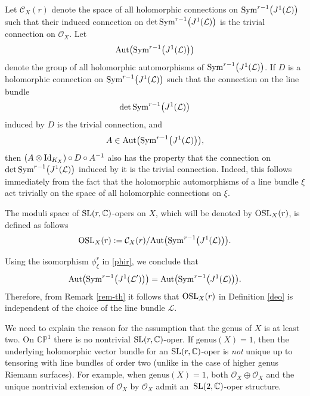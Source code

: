 \documentclass[10pt,a4paper]{amsart}
\numberwithin{equation}{section}
\begin{document}
Let ${\mathcal C}_X(r)$ denote the space of all holomorphic connections on ${\rm Sym}^{r-1}\bigl(J^1(\mathcal L)\bigr)$ such that their induced connection on $\det {\rm Sym}^{r-1}\bigl(J^1(\mathcal
L)\bigr)$ is the trivial connection on ${\mathcal O}_X$. Let
\[
\text{Aut}\bigl({\rm
Sym}^{r-1}\bigl(J^1(\mathcal L)\bigr)\bigr)\]
 denote the group of all holomorphic automorphisms of ${\rm
Sym}^{r-1}\bigl(J^1(\mathcal L)\bigr)$. If $D$ is a holomorphic connection on ${\rm
Sym}^{r-1}\bigl(J^1(\mathcal L)\bigr)$ such that the connection on the line bundle
\[
\det {\rm
Sym}^{r-1}\bigl(J^1(\mathcal L)\bigr)\]
 induced by $D$ is the trivial connection, and
\[
A \in \text{Aut}\bigl({\rm Sym}^{r-1}\bigl(J^1(\mathcal L)\bigr)\bigr),
\]
then %
$(A\otimes{\rm
Id}_{K_X})\circ D\circ A^{-1}$ also has the property that the connection on $\det {\rm
Sym}^{r-1}\bigl(J^1(\mathcal L)\bigr)$ induced by it is the trivial connection. Indeed, this follows immediately from
the fact that the holomorphic automorphisms of a line bundle $\xi$ act trivially on the space of all
holomorphic connections on $\xi$.

\begin{Definition}\label{deo}
The moduli space of ${\rm SL}(r, {\mathbb C})$-opers on $X$, which will be denoted by ${\rm OSL}_X(r)$, is defined as follows
\begin{equation}\label{f2}
{\rm OSL}_X(r) := {\mathcal C}_X(r)/\text{Aut}\bigl({\rm
Sym}^{r-1}\bigl(J^1(\mathcal L)\bigr)\bigr).
\end{equation}\end{Definition}

{}Using the isomorphism $\phi^r_\xi$ in \eqref{phir}, we conclude that
\[
\text{Aut}\bigl({\rm Sym}^{r-1}\bigl(J^1({\mathcal L}')\bigr)\bigr)
 = \text{Aut}\bigl({\rm Sym}^{r-1}\bigl(J^1(\mathcal L)\bigr)\bigr).\]
 Therefore, from Remark \ref{rem-th} it follows that
${\rm OSL}_X(r)$ in Definition \ref{deo} is independent of the choice of the line bundle $\mathcal L$.

\begin{Remark}
We need to explain the reason for the assumption that the genus of $X$ is at least two. On ${\mathbb C}{\mathbb P}^1$ there
is no nontrivial ${\rm SL}(r, {\mathbb C})$-oper. If $\text{genus}(X) = 1$, then the underlying holomorphic vector
bundle for an ${\rm SL}(r, {\mathbb C})$-oper is \textit{not} unique up to tensoring with line bundles of order two (unlike
in the case of higher genus Riemann surfaces). For example, when ${\text{genus}(X) = 1}$, both
${\mathcal O}_X\oplus {\mathcal O}_X$ and the unique nontrivial extension of ${\mathcal O}_X$ by ${\mathcal O}_X$ admit an~${\rm SL}(2, {\mathbb C})$-oper structure.
\end{Remark}
\end{document}
